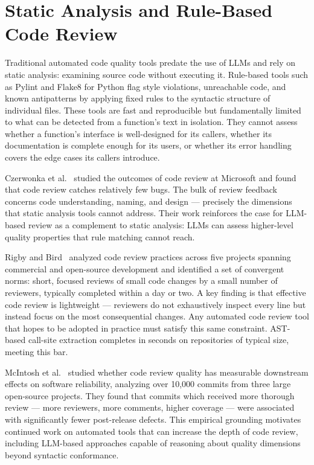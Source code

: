 \documentclass[12pt]{report}
\begin{document}
\section{Static Analysis and Rule-Based Code Review}

Traditional automated code quality tools predate the use of LLMs and rely on static analysis: examining source code without executing it. Rule-based tools such as Pylint and Flake8 for Python flag style violations, unreachable code, and known antipatterns by applying fixed rules to the syntactic structure of individual files. These tools are fast and reproducible but fundamentally limited to what can be detected from a function's text in isolation. They cannot assess whether a function's interface is well-designed for its callers, whether its documentation is complete enough for its users, or whether its error handling covers the edge cases its callers introduce.

Czerwonka et al.~\cite{czerwonka2015code} studied the outcomes of code review at Microsoft and found that code review catches relatively few bugs. The bulk of review feedback concerns code understanding, naming, and design --- precisely the dimensions that static analysis tools cannot address. Their work reinforces the case for LLM-based review as a complement to static analysis: LLMs can assess higher-level quality properties that rule matching cannot reach.

Rigby and Bird~\cite{rigby2013convergent} analyzed code review practices across five projects spanning commercial and open-source development and identified a set of convergent norms: short, focused reviews of small code changes by a small number of reviewers, typically completed within a day or two. A key finding is that effective code review is lightweight --- reviewers do not exhaustively inspect every line but instead focus on the most consequential changes. Any automated code review tool that hopes to be adopted in practice must satisfy this same constraint. AST-based call-site extraction completes in seconds on repositories of typical size, meeting this bar.

McIntosh et al.~\cite{mcintosh2016empirical} studied whether code review quality has measurable downstream effects on software reliability, analyzing over 10,000 commits from three large open-source projects. They found that commits which received more thorough review --- more reviewers, more comments, higher coverage --- were associated with significantly fewer post-release defects. This empirical grounding motivates continued work on automated tools that can increase the depth of code review, including LLM-based approaches capable of reasoning about quality dimensions beyond syntactic conformance.
\end{document}
